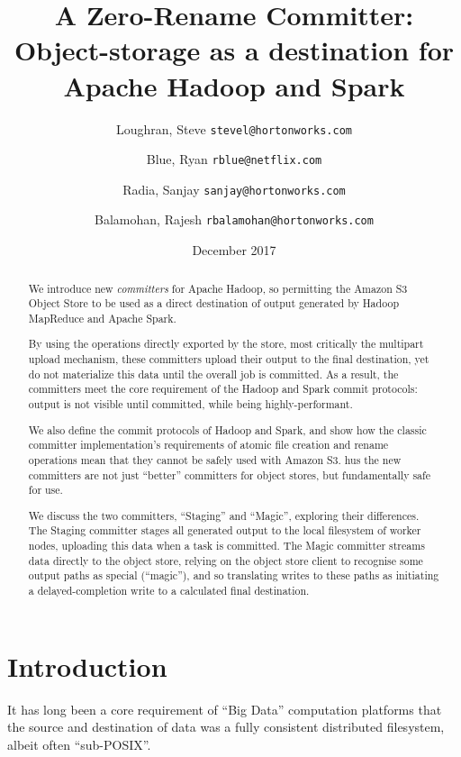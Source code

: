 \documentclass[conference]{IEEEtran}
\title{
A Zero-Rename Committer:\\
Object-storage as a destination for Apache Hadoop and Spark}
\author{
  Loughran, Steve
  \texttt{stevel@hortonworks.com}\\
\and
  Blue, Ryan
  \texttt{rblue@netflix.com}\\
\and
  Radia, Sanjay
  \texttt{sanjay@hortonworks.com} \\
\and
  Balamohan, Rajesh
  \texttt{rbalamohan@hortonworks.com} \\
}
\date{December 2017}
\begin{document}
\maketitle


\begin{abstract}

We introduce new \emph{committers} for Apache Hadoop, so permitting
the Amazon S3 Object Store to be used as a direct destination of output generated
by Hadoop MapReduce and Apache Spark.

By using the operations directly exported by
the store, most critically the multipart upload mechanism, these committers upload
their output to the final destination, yet do not materialize this data until the
overall job is committed.
As a result, the committers meet the core requirement of the Hadoop and Spark commit
protocols: output is not visible until committed, while being highly-performant.

We also define the commit protocols of Hadoop and Spark, and show how the classic committer
implementation's requirements of atomic file creation and rename operations mean that they
cannot be safely used with Amazon S3.
hus the new committers are not just ``better'' committers for object stores,
but fundamentally safe for use.

We discuss the two committers, ``Staging'' and ``Magic'', exploring their differences.
The Staging committer stages all generated output to the local filesystem of
worker nodes, uploading this data when a task is committed.
The Magic committer streams data directly to the object store, relying on the
object store client to recognise some output paths as special (``magic''), and
so translating writes to these paths as initiating a delayed-completion write
to a calculated final destination.

\end{abstract}


\section{Introduction}
\label{sec:introduction}

It has long been a core requirement of ``Big Data'' computation platforms that
the source and destination of data was a fully consistent distributed filesystem,
albeit often ``sub-POSIX''.
\end{document}
